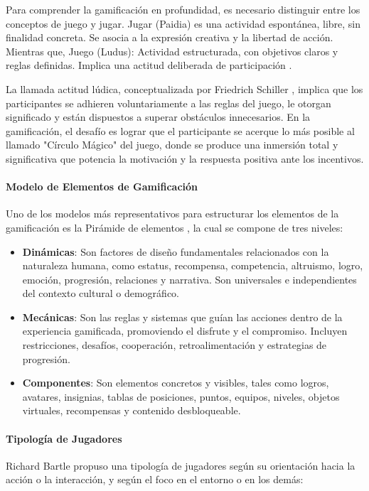 Para comprender la gamificación en profundidad, es necesario distinguir entre los conceptos de juego y jugar. Jugar (Paidia) es una actividad espontánea, libre, sin finalidad concreta. Se asocia a la expresión creativa y la libertad de acción. Mientras que, Juego (Ludus): Actividad estructurada, con objetivos claros y reglas definidas. Implica una actitud deliberada de participación \cite{huizinga1938,caillois1961}.

La llamada actitud lúdica, conceptualizada por Friedrich Schiller \cite{schiller1795}, implica que los participantes se adhieren voluntariamente a las reglas del juego, le otorgan significado y están dispuestos a superar obstáculos innecesarios. En la gamificación, el desafío es lograr que el participante se acerque lo más posible al llamado "Círculo Mágico" del juego, donde se produce una inmersión total y significativa que potencia la motivación y la respuesta positiva ante los incentivos.

\paragraph{Modelo de Elementos de Gamificación}
Uno de los modelos más representativos para estructurar los elementos de la gamificación es la Pirámide de elementos \cite{werbach2012}, la cual se compone de tres niveles:

\begin{itemize}
\item \textbf{Dinámicas}: Son factores de diseño fundamentales relacionados con la naturaleza humana, como estatus, recompensa, competencia, altruismo, logro, emoción, progresión, relaciones y narrativa. Son universales e independientes del contexto cultural o demográfico.
\item \textbf{Mecánicas}: Son las reglas y sistemas que guían las acciones dentro de la experiencia gamificada, promoviendo el disfrute y el compromiso. Incluyen restricciones, desafíos, cooperación, retroalimentación y estrategias de progresión.
\item \textbf{Componentes}: Son elementos concretos y visibles, tales como logros, avatares, insignias, tablas de posiciones, puntos, equipos, niveles, objetos virtuales, recompensas y contenido desbloqueable.
\end{itemize}

\paragraph{Tipología de Jugadores}
Richard Bartle \cite{bartle1996} propuso una tipología de jugadores según su orientación hacia la acción o la interacción, y según el foco en el entorno o en los demás:

